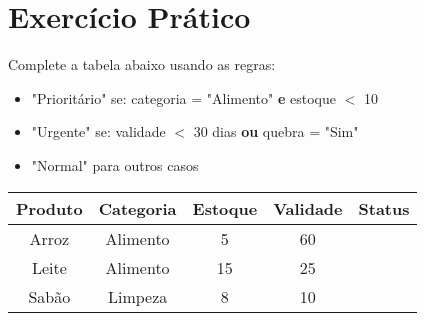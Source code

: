 \documentclass[11pt]{article}
\begin{document}
\section*{Exercício Prático}

Complete a tabela abaixo usando as regras:
\begin{itemize}
\item "Prioritário" se: categoria = "Alimento" \textbf{e} estoque $<$ 10
\item "Urgente" se: validade $<$ 30 dias \textbf{ou} quebra = "Sim"
\item "Normal" para outros casos
\end{itemize}

\begin{tabular}{|c|c|c|c|c|}
\hline
Produto & Categoria & Estoque & Validade & Status \\
\hline
Arroz & Alimento & 5 & 60 & \\
\hline
Leite & Alimento & 15 & 25 & \\
\hline
Sabão & Limpeza & 8 & 10 & \\
\hline
\end{tabular}
\end{document}
